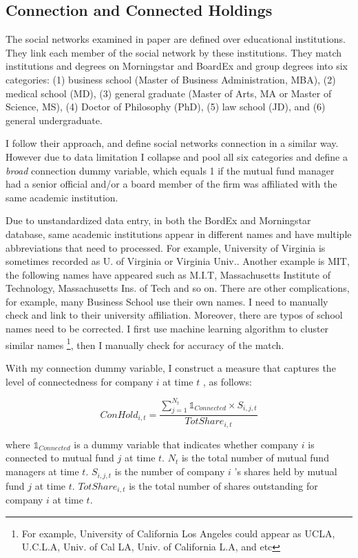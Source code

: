 \documentclass[11pt]{article}
\begin{document}
\begin{doublespace}
\subsection{Connection and Connected Holdings}
The social networks examined in \cite{cohen2008small} paper are defined over educational institutions. They link each member of the social network by these institutions. They match institutions and degrees on Morningstar and BoardEx and group degrees into six categories: (1) business school (Master of Business Administration, MBA), (2) medical school (MD), (3) general graduate (Master of Arts, MA or Master of Science, MS), (4) Doctor of Philosophy (PhD), (5) law school (JD), and (6) general undergraduate. 

I follow their approach, and define social networks connection in a similar way. However due to data limitation I collapse and pool all six categories and define a \emph{broad} connection dummy variable, which equals 1 if the mutual fund manager had a senior official and/or a board member of the firm was affiliated with the same academic institution. 

Due to unstandardized data entry, in both the BordEx and Morningstar database, same academic institutions appear in different names and have multiple abbreviations that need to processed. For example, University of Virginia is sometimes recorded as U. of Virginia or Virginia Univ.. Another example is MIT, the following names have appeared such as M.I.T, Massachusetts Institute of Technology, Massachusetts Ins. of Tech and so on. There are other complications, for example, many Business School use their own names. I need to manually check and link to their university affiliation. Moreover, there are typos of school names need to be corrected. I first use machine learning algorithm to cluster similar names \footnote{For example, University of California Los Angeles could appear as UCLA, U.C.L.A, Univ. of Cal LA, Univ. of California L.A, and etc}, then I manually check for accuracy of the match. 

With my connection dummy variable, I construct a measure that captures the level of connectedness for company $i$ at time $t$ , as follows:

\begin{equation}
 ConHold_{i,t} = \frac{\sum_{j=1}^{N_t}\mathbb{1}_{Connected} \times S_{i,j,t}} {TotShare_{i,t}}
\label{eq:eq1}
\end{equation}

where $\mathbb{1}_{Connected}$ is a dummy variable that indicates whether company $i$ is connected to mutual fund $j$ at time $t$. $N_t$ is the total number of mutual fund managers at time $t$.  $S_{i,j,t}$ is the number of company $i$ 's shares held by mutual fund $j$ at time $t$. $TotShare_{i,t}$ is the total number of shares outstanding for company $i$ at time $t$. 


\end{doublespace}
\end{document}
